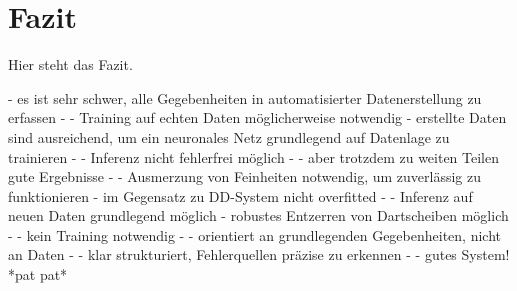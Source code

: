 
\chapter{Fazit}
\label{cha:fazit}

Hier steht das Fazit.

- es ist sehr schwer, alle Gegebenheiten in automatisierter Datenerstellung zu erfassen
- - Training auf echten Daten möglicherweise notwendig
- erstellte Daten sind ausreichend, um ein neuronales Netz grundlegend auf Datenlage zu trainieren
- - Inferenz nicht fehlerfrei möglich
- - aber trotzdem zu weiten Teilen gute Ergebnisse
- - Ausmerzung von Feinheiten notwendig, um zuverlässig zu funktionieren
- im Gegensatz zu DD-System nicht overfitted
- - Inferenz auf neuen Daten grundlegend möglich
- robustes Entzerren von Dartscheiben möglich
- - kein Training notwendig
- - orientiert an grundlegenden Gegebenheiten, nicht an Daten
- - klar strukturiert, Fehlerquellen präzise zu erkennen
- - gutes System! *pat pat*

